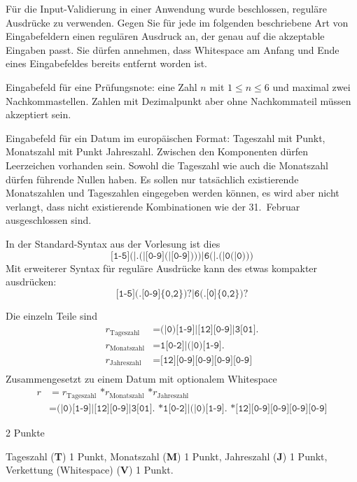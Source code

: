 Für die Input-Validierung in einer Anwendung wurde beschlossen, reguläre
Ausdrücke zu verwenden.
Gegen Sie für jede im folgenden beschriebene Art von Eingabefeldern einen
regulären Ausdruck an, der genau auf die akzeptable Eingaben passt.
Sie dürfen annehmen, dass Whitespace am Anfang und Ende eines Eingabefeldes
bereits entfernt worden ist.
\begin{teilaufgaben}
\item
Eingabefeld für eine Prüfungsnote: eine Zahl $n$ mit $1\le n\le 6$
und maximal zwei Nachkommastellen.
Zahlen mit Dezimalpunkt aber ohne Nachkommateil müssen akzeptiert sein.
\item
Eingabefeld für ein Datum im europäischen Format: Tageszahl mit Punkt,
Monatszahl mit Punkt Jahreszahl. Zwischen den Komponenten dürfen Leerzeichen
vorhanden sein.
Sowohl die Tageszahl wie auch die Monatszahl dürfen führende Nullen haben.
Es sollen nur tatsächlich existierende Monatszahlen
und Tageszahlen eingegeben werden können, es wird aber nicht verlangt,
dass nicht existierende Kombinationen wie der 31.~Februar ausgeschlossen
sind.
\end{teilaufgaben}


\begin{loesung}
\begin{teilaufgaben}
\item In der Standard-Syntax aus der Vorlesung ist dies
\[
\texttt{[1-5](|.(|[0-9](|[0-9])))|6(|.(|0(|0)))}
\]
Mit erweiterer Syntax für reguläre Ausdrücke kann des etwas kompakter
ausdrücken:
\[
\texttt{[1-5](.[0-9]\{0,2\})?|6(.[0]\{0,2\})?}
\]
\item Die einzeln Teile sind
\begin{align*}
r_{\text{Tageszahl}}
&=
\texttt{(|0)[1-9]|[12][0-9]|3[01].}
\\
r_{\text{Monatszahl}}
&=
\texttt{1[0-2]|(|0)[1-9].}
\\
r_{\text{Jahreszahl}}
&=
\texttt{[12][0-9][0-9][0-9][0-9]}
\\
\end{align*}
Zusammengesetzt zu einem Datum mit optionalem Whitespace
\begin{align*}
r
&=
r_{\text{Tageszahl}}
\texttt{ *}
r_{\text{Monatszahl}}
\texttt{ *}
r_{\text{Jahreszahl}}
\\
&=
\texttt{(|0)[1-9]|[12][0-9]|3[01].}
\texttt{ *}
\texttt{1[0-2]|(|0)[1-9].}
\texttt{ *}
\texttt{[12][0-9][0-9][0-9][0-9]}
\end{align*}
\end{teilaufgaben}
\end{loesung}

\begin{bewertung}
\begin{teilaufgaben}
\item 2 Punkte
\item Tageszahl ({\bf T}) 1 Punkt, Monatszahl ({\bf M}) 1 Punkt,
Jahreszahl ({\bf J}) 1 Punkt, Verkettung (Whitespace) ({\bf V}) 1 Punkt.
\end{teilaufgaben}
\end{bewertung}

